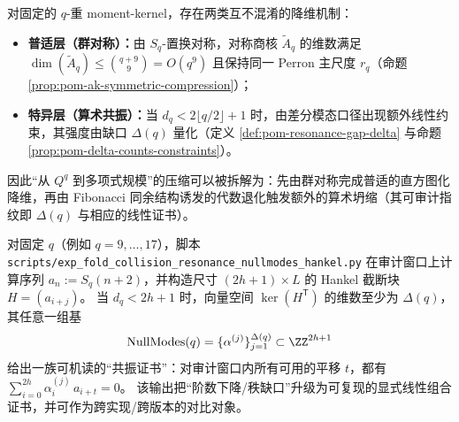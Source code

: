 \begin{remark}\label{rem:pom-two-layer-dim-reduction}
对固定的 \(q\)-重 moment-kernel，存在两类互不混淆的降维机制：
\begin{itemize}
  \item \textbf{普适层（群对称）：}由 \(S_q\)-置换对称，对称商核 \(\widetilde A_q\) 的维数满足
  \(
  \dim(\widetilde A_q)\le \binom{q+9}{9}=O(q^9)
  \)
  且保持同一 Perron 主尺度 \(r_q\)（命题 \ref{prop:pom-ak-symmetric-compression}）；
  \item \textbf{特异层（算术共振）：}当 \(d_q<2\lfloor q/2\rfloor+1\) 时，由差分模态口径出现额外线性约束，其强度由缺口 \(\Delta(q)\) 量化（定义 \ref{def:pom-resonance-gap-delta} 与命题 \ref{prop:pom-delta-counts-constraints}）。
\end{itemize}
因此“从 \(Q^q\) 到多项式规模”的压缩可以被拆解为：先由群对称完成普适的直方图化降维，再由 Fibonacci 同余结构诱发的代数退化触发额外的算术坍缩（其可审计指纹即 \(\Delta(q)\) 与相应的线性证书）。
\end{remark}

\begin{remark}\label{rem:pom-nullmodes-algorithm}
对固定 \(q\)（例如 \(q=9,\dots,17\)），脚本 \texttt{scripts/exp\_fold\_collision\_resonance\_nullmodes\_hankel.py} 在审计窗口上计算序列 \(a_n:=S_q(n+2)\)，并构造尺寸 \((2h+1)\times L\) 的 Hankel 截断块 \(H=(a_{i+j})\)。
当 \(d_q<2h+1\) 时，向量空间 \(\ker(H^{\mathsf T})\) 的维数至少为 \(\Delta(q)\)，其任意一组基
\[
\mathrm{NullModes}(q)=\{\alpha^{(j)}\}_{j=1}^{\Delta(q)}\subset\ZZ^{2h+1}
\]
给出一族可机读的“共振证书”：对审计窗口内所有可用的平移 \(t\)，都有
\(
\sum_{i=0}^{2h}\alpha^{(j)}_i\,a_{i+t}=0
\)。
该输出把“阶数下降/秩缺口”升级为可复现的显式线性组合证书，并可作为跨实现/跨版本的对比对象。
\end{remark}





